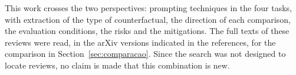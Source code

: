 This work crosses the two perspectives: prompting techniques in the four tasks, with extraction of the type of
counterfactual, the direction of each comparison, the evaluation conditions, the risks and the mitigations. The full
texts of these reviews were read, in the arXiv versions indicated in the references, for the comparison in Section~\ref{sec:comparacao}. Since the
search was not designed to locate reviews, no claim is made that this combination is new.
